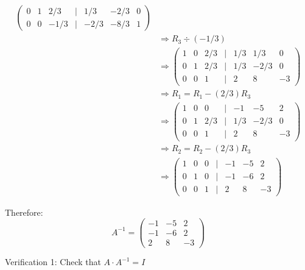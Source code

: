 \documentclass{article}
\begin{document}
\begin{align*}
\begin{pmatrix}
0 & 1 & 2/3 & | & 1/3 & -2/3 & 0 \\
0 & 0 & -1/3 & | & -2/3 & -8/3 & 1
\end{pmatrix}\\
&\Rightarrow R_3 \div (-1/3)\\
&\Rightarrow
\begin{pmatrix} 
1 & 0 & 2/3 & | & 1/3 & 1/3 & 0 \\
0 & 1 & 2/3 & | & 1/3 & -2/3 & 0 \\
0 & 0 & 1 & | & 2 & 8 & -3
\end{pmatrix}\\
&\Rightarrow R_1 = R_1 - (2/3)R_3\\
&\Rightarrow
\begin{pmatrix} 
1 & 0 & 0 & | & -1 & -5 & 2 \\
0 & 1 & 2/3 & | & 1/3 & -2/3 & 0 \\
0 & 0 & 1 & | & 2 & 8 & -3
\end{pmatrix}\\
&\Rightarrow R_2 = R_2 - (2/3)R_3\\
&\Rightarrow
\begin{pmatrix} 
1 & 0 & 0 & | & -1 & -5 & 2 \\
0 & 1 & 0 & | & -1 & -6 & 2 \\
0 & 0 & 1 & | & 2 & 8 & -3
\end{pmatrix}
\end{align*}

Therefore:
$$
A^{-1} = \begin{pmatrix} -1 & -5 & 2 \\ -1 & -6 & 2 \\ 2 & 8 & -3 \end{pmatrix}$$

Verification 1: Check that $A \cdot A^{-1} = I$
\end{document}

